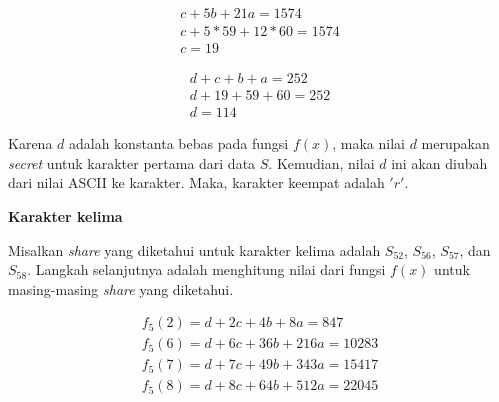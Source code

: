 \begin{gather*}
	c + 5b + 21a = 1574 \\
	c + 5*59 + 12*60 = 1574 \\
	c = 19
\end{gather*}

\begin{gather*}
	d + c + b + a = 252 \\
	d + 19 + 59 + 60 = 252 \\
	d = 114
\end{gather*}

Karena \begin{math}d\end{math} adalah konstanta bebas pada fungsi \begin{math}f(x)\end{math}, maka nilai \begin{math}d\end{math} merupakan \textit{secret} untuk karakter pertama dari data \begin{math}S\end{math}. Kemudian, nilai \begin{math}d\end{math} ini akan diubah dari nilai ASCII ke karakter. Maka, karakter keempat adalah \begin{math}'r'\end{math}.

\begin{flushleft}
	\textbf{Karakter kelima}
\end{flushleft}

Misalkan \textit{share} yang diketahui untuk karakter kelima adalah \begin{math}S_{52}\end{math}, \begin{math}S_{56}\end{math}, \begin{math}S_{57}\end{math}, dan \begin{math}S_{58}\end{math}. Langkah selanjutnya adalah menghitung nilai dari fungsi \begin{math}f(x)\end{math} untuk masing-masing \textit{share} yang diketahui.

\begin{gather*}
	f_5(2) = d + 2c + 4b + 8a = 847 \\
	f_5(6) = d + 6c + 36b + 216a = 10283 \\
	f_5(7) = d + 7c + 49b + 343a = 15417 \\
	f_5(8) = d + 8c + 64b + 512a = 22045
\end{gather*}

